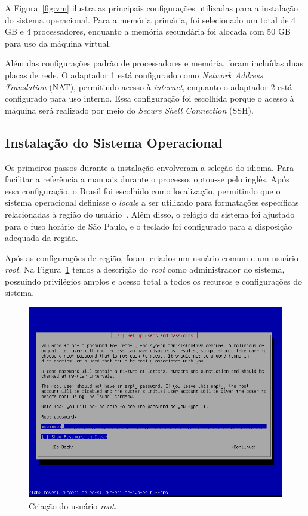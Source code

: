 \documentclass[
	12pt,				%
	oneside,   	        %
	a4paper,			%
	english,			%
	french,				%
	spanish,			%
	brazil,				%
	]{pacotes/abntex2}
\begin{document}
A Figura~\ref{fig:vm} ilustra as principais configurações utilizadas para a instalação do sistema operacional. Para a memória primária, foi selecionado um total de 4 GB e 4 processadores, enquanto a memória secundária foi alocada com 50 GB para uso da máquina virtual.

Além das configurações padrão de processadores e memória, foram incluídas duas placas de rede. O adaptador 1 está configurado como \textit{Network Address Translation} (NAT), permitindo acesso à \textit{internet}, enquanto o adaptador 2 está configurado para uso interno. Essa configuração foi escolhida porque o acesso à máquina será realizado por meio do \textit{Secure Shell Connection} (SSH).

\subsection{Instalação do Sistema Operacional}
\label{subsec:instalacao}

Os primeiros passos durante a instalação envolveram a seleção do idioma. Para facilitar a referência a manuais durante o processo, optou-se pelo inglês. Após essa configuração, o Brasil foi escolhido como localização, permitindo que o sistema operacional definisse o \textit{locale} a ser utilizado para formatações específicas relacionadas à região do usuário~\cite{kerris2010}. Além disso, o relógio do sistema foi ajustado para o fuso horário de São Paulo, e o teclado foi configurado para a disposição adequada da região.

Após as configurações de região, foram criados um usuário comum e um usuário \textit{root}. Na Figura~\ref{fig:root} temos a descrição do \textit{root} como administrador do sistema, possuindo privilégios amplos e acesso total a todos os recursos e configurações do sistema.

\begin{figure}[H]
  \centering
  \includegraphics[scale=0.7]{figuras/root.png}
  \caption{Criação do usuário \textit{root}.}
  \label{fig:root}
\end{figure}
\end{document}
